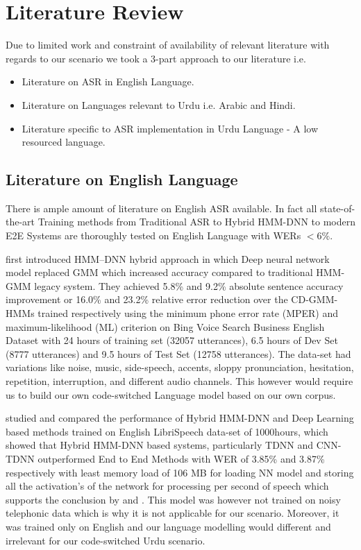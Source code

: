 \chapter{Literature Review} %
\label{cha:literature_review}

Due to limited work and constraint of availability of relevant literature with regards to our scenario we took a 3-part approach to our literature i.e.
\begin{itemize}
    \item Literature on ASR in English Language.
    \item Literature on Languages relevant to Urdu i.e. Arabic and Hindi.
    \item Literature specific to ASR implementation in Urdu Language - A low resourced language.
\end{itemize}

\section{Literature on English Language}

There is ample amount of literature on English ASR available. In fact all state-of-the-art Training methods from Traditional ASR to Hybrid HMM-DNN to modern E2E Systems are thoroughly tested on English Language with WERs $<6\%$. 

\cite{dahl_context-dependent_2012} first introduced HMM–DNN hybrid approach in which Deep neural network model replaced GMM which increased accuracy compared to traditional HMM-GMM legacy system. They achieved 5.8\% and 9.2\% absolute sentence accuracy improvement or 16.0\% and 23.2\% relative error reduction over the CD-GMM-HMMs trained respectively using the minimum phone error rate (MPER) and maximum-likelihood (ML) criterion on Bing Voice Search Business English Dataset with 24 hours of training set (32057 utterances), 6.5 hours of Dev Set (8777 utterances) and 9.5 hours of Test Set (12758 utterances). The data-set had variations like noise, music, side-speech, accents, sloppy pronunciation, hesitation, repetition, interruption, and different audio channels. This however would require us to build our own code-switched Language model based on our own corpus.

\cite{georgescu_performance_2021} studied and compared the performance of Hybrid HMM-DNN and Deep Learning based methods trained on English LibriSpeech data-set of 1000hours, which showed that Hybrid HMM-DNN based systems, particularly TDNN and CNN-TDNN outperformed End to End Methods with WER of 3.85\% and 3.87\% respectively with least memory load of 106 MB for loading NN model and storing all the activation's of the network for processing per second of speech which supports the conclusion by \cite{christian_gaida_comparing_2014} and \cite{naeem_subspace_2020}. This model was however not trained on noisy telephonic data which is why it is not applicable for our scenario. Moreover, it was trained only on English and our language modelling would different and irrelevant for our code-switched Urdu scenario.  

